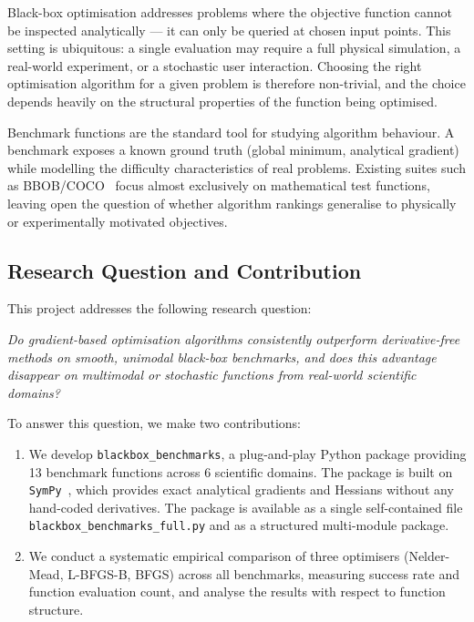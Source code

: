 Black-box optimisation addresses problems where the objective function cannot
be inspected analytically — it can only be queried at chosen input points.
This setting is ubiquitous: a single evaluation may require a full physical
simulation, a real-world experiment, or a stochastic user interaction. Choosing
the right optimisation algorithm for a given problem is therefore non-trivial,
and the choice depends heavily on the structural properties of the function
being optimised.

Benchmark functions are the standard tool for studying algorithm behaviour.
A benchmark exposes a known ground truth (global minimum, analytical gradient)
while modelling the difficulty characteristics of real problems. Existing
suites such as BBOB/COCO~\cite{hansen2021coco} focus almost exclusively on
mathematical test functions, leaving open the question of whether algorithm
rankings generalise to physically or experimentally motivated objectives.

\subsection{Research Question and Contribution}

This project addresses the following research question:

\begin{center}
\textit{Do gradient-based optimisation algorithms consistently outperform
derivative-free methods on smooth, unimodal black-box benchmarks, and does
this advantage disappear on multimodal or stochastic functions from
real-world scientific domains?}
\end{center}

To answer this question, we make two contributions:

\begin{enumerate}
  \item We develop \texttt{blackbox\_benchmarks}, a plug-and-play Python
        package providing 13 benchmark functions across 6 scientific domains.
        The package is built on \texttt{SymPy}~\cite{sympy2017}, which
        provides exact analytical gradients and Hessians without any
        hand-coded derivatives. The package is available as a single
        self-contained file \texttt{blackbox\_benchmarks\_full.py} and
        as a structured multi-module package.

  \item We conduct a systematic empirical comparison of three optimisers
        (Nelder-Mead, L-BFGS-B, BFGS) across all benchmarks, measuring
        success rate and function evaluation count, and analyse the results
        with respect to function structure.
\end{enumerate}

